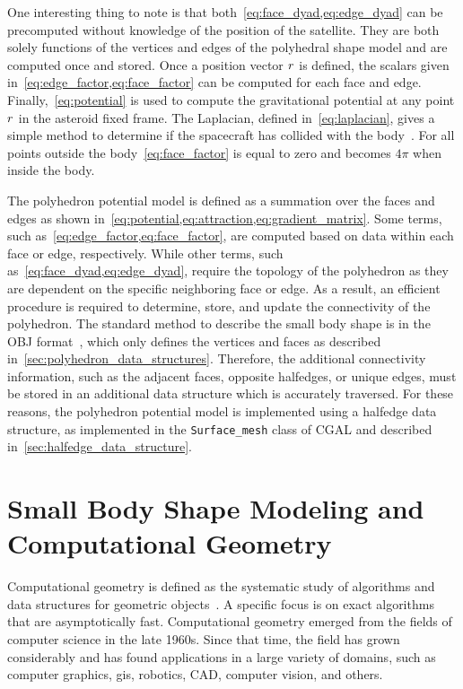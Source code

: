 One interesting thing to note is that both~\cref{eq:face_dyad,eq:edge_dyad} can be precomputed without knowledge of the position of the satellite.
They are both solely functions of the vertices and edges of the polyhedral shape model and are computed once and stored.
Once a position vector \( r \) is defined, the scalars given in~\cref{eq:edge_factor,eq:face_factor} can be computed for each face and edge.
Finally,~\cref{eq:potential} is used to compute the gravitational potential at any point \( r \) in the asteroid fixed frame.
The Laplacian, defined in~\cref{eq:laplacian}, gives a simple method to determine if the spacecraft has collided with the body~\cite{werner1996}. 
For all points outside the body~\cref{eq:face_factor} is equal to zero and becomes \( 4 \pi \) when inside the body.

The polyhedron potential model is defined as a summation over the faces and edges as shown in~\cref{eq:potential,eq:attraction,eq:gradient_matrix}.
Some terms, such as~\cref{eq:edge_factor,eq:face_factor}, are computed based on data within each face or edge, respectively.
While other terms, such as~\cref{eq:face_dyad,eq:edge_dyad}, require the topology of the polyhedron as they are dependent on the specific neighboring face or edge.
As a result, an efficient procedure is required to determine, store, and update the connectivity of the polyhedron. 
The standard method to describe the small body shape is in the OBJ format~\cite{neese2004}, which only defines the vertices and faces as described in~\cref{sec:polyhedron_data_structures}.
Therefore, the additional connectivity information, such as the adjacent faces, opposite halfedges, or unique edges, must be stored in an additional data structure which is accurately traversed.
For these reasons, the polyhedron potential model is implemented using a halfedge data structure, as implemented in the \texttt{Surface\_mesh} class of CGAL and described in~\cref{sec:halfedge_data_structure}.

\section{Small Body Shape Modeling and Computational Geometry}\label{sec:computational_geometry}

Computational geometry is defined as the systematic study of algorithms and data structures for geometric objects~\cite{berg2008}.
A specific focus is on exact algorithms that are asymptotically fast.
Computational geometry emerged from the fields of computer science in the late 1960s.
Since that time, the field has grown considerably and has found applications in a large variety of domains, such as computer graphics, \gls{gis}, robotics, \gls{CAD}, computer vision, and others.

